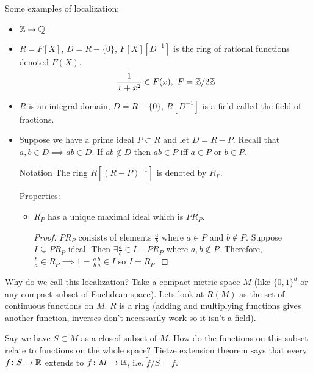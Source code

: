 \documentclass[a4paper,twoside,master.tex]{subfiles}
\begin{document}
\begin{ex}
    Some examples of localization:
    \begin{itemize}
        \item $ \mathbb{Z} \to \mathbb{Q} $
        \item $ R = F[X] $, $ D = R- \{0\} $, $ F[X][D^{-1}] $ is the ring of rational functions denoted $ F(X) $.
            \begin{equation}
                \frac{1}{x + x^2} \in F(x),\ F = \mathbb{Z}/2\mathbb{Z}
            \end{equation}
        \item $ R $ is an integral domain, $ D = R- \{0\} $, $ R[D^{-1}] $ is a field called the field of fractions.
        \item Suppose we have a prime ideal $ P \subset R $ and let $ D = R - P $. Recall that $ a,b \in D \implies a b \in D $. If $ a b \notin D $ then $ a b \in P $ iff $ a \in P $ or $ b \in P $.
            \begin{note}{Notation}
                The ring $ R[(R-P)^{-1}] $ is denoted by $ R_{P} $.
            \end{note}
            Properties:
            \begin{itemize}
                \item $ R_P $ has a unique maximal ideal which is $ P R_P $.
                    \begin{proof}
                        $ P R_P $ consists of elements $ \frac{a}{b} $ where $ a \in P $ and $ b \notin P $. Suppose $ I \subsetneq P R_P $ ideal. Then $ \exists \frac{a}{b} \in I - P R_P $ where $ a,b \notin P $. Therefore, $ \frac{b}{a} \in R_P \implies 1 = \frac{a}{b} \frac{b}{a} \in I $ so $ I = R_P $.
                    \end{proof}
            \end{itemize}
    \end{itemize}
\end{ex}

Why do we call this localization? Take a compact metric space $ M $ (like $ \{0,1\}^d $ or any compact subset of Euclidean space). Lets look at $ R(M) $ as the set of continuous functions on $ M $. $ R $ is a ring (adding and multiplying functions gives another function, inverses don't necessarily work so it isn't a field).

Say we have $ S\subset M $ as a closed subset of $ M $. How do the functions on this subset relate to functions on the whole space? Tietze extension theorem says that every $ f\colon S \to \mathbb{R} $ extends to $ \tilde{f}\colon M \to \mathbb{R} $, i.e. $ \tilde{f} / S = f $.
\end{document}
